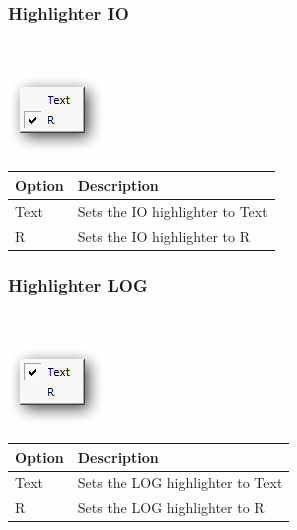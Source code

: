 \hypertarget{menu_r_rterm_highlighter_IO}{}
\subsubsection{Highlighter IO}\\

\includegraphics[scale=0.50]{./res/menu_r_rterm_highlighter_io.png}\\

\begin{scriptsize}\begin{tabularx}{\textwidth}{>{\hsize=0.3\hsize}X>{\hsize=0.7\hsize}X}\\
    \hline
    \textbf{Option} & \textbf{Description} \\
    \hline
    Text & Sets the IO highlighter to Text \\
    R & Sets the IO highlighter to R \\
    \hline
  \end{tabularx}\end{scriptsize}


\hypertarget{menu_r_rterm_highlighter_Log}{}
\subsubsection{Highlighter LOG}\\

\includegraphics[scale=0.50]{./res/menu_r_rterm_highlighter_log.png}\\

\begin{scriptsize}\begin{tabularx}{\textwidth}{>{\hsize=0.3\hsize}X>{\hsize=0.7\hsize}X}\\
    \hline
    \textbf{Option} & \textbf{Description} \\
    \hline
    Text & Sets the LOG highlighter to Text \\
    R & Sets the LOG highlighter to R \\
    \hline
  \end{tabularx}\end{scriptsize}


